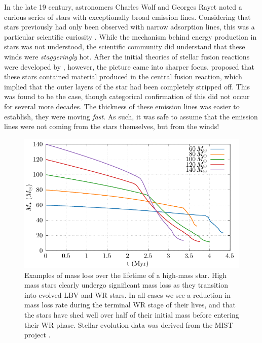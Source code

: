 
\noindent
In the late 19 century, astronomers Charles Wolf and Georges Rayet noted a curious series of stars with exceptionally broad emission lines.
Considering that stars previously had only been observed with narrow adsorption lines, this was a particular scientific curiosity
\parencite{crowther_physical_2007}.
While the mechanism behind energy production in stars was not understood, the scientific community did understand that these winds were \emph{staggeringly} hot.
After the initial theories of stellar fusion reactions were developed by \textcite{betheEnergyProductionStars1939}, however, the picture came into sharper focus.
\textcite{gamowWCWNStars1943} proposed that these stars contained material produced in the central fusion reaction, which implied that the outer layers of the star had been completely stripped off.
This was found to be the case, though categorical confirmation of this did not occur for several more decades.
The thickness of these emission lines was easier to establish, they were moving \emph{fast}.
As such, it was safe to assume that the emission lines were not coming from the stars themselves, but from the winds!


\begin{figure}[ht]
  \centering
  \includegraphics{assets/massloss/massloss.pdf}
  \caption[Examples of mass loss over the lifetime of a high-mass star]{Examples of mass loss over the lifetime of a high-mass star. High mass stars clearly undergo significant mass loss as they transition into evolved LBV and WR stars. In all cases we see a reduction in mass loss rate during the terminal WR stage of their lives, and that the stars have shed well over half of their initial mass before entering their WR phase. Stellar evolution data was derived from the MIST project \parencite{choiMesaIsochronesStellar2016,dotterMESAIsochronesStellar2016,paxtonModulesExperimentsStellar2011}.}
  \label{fig:mist-massloss}
\end{figure}

